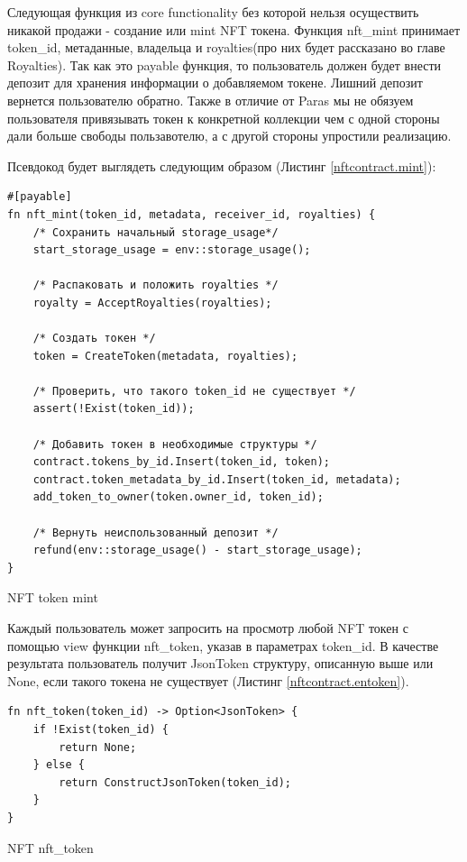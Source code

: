 Следующая функция из core functionality без которой нельзя осуществить никакой продажи - создание или mint NFT токена. Функция nft\_mint принимает token\_id, метаданные, владельца и royalties(про них будет рассказано во главе Royalties).
Так как это payable функция, то пользователь должен будет внести депозит для хранения информации о добавляемом токене. Лишний депозит вернется пользователю обратно.
Также в отличие от Paras мы не обязуем пользователя привязывать токен к конкретной коллекции чем с одной стороны дали больше свободы пользавотелю, а с другой стороны упростили реализацию.

Псевдокод будет выглядеть следующим образом (Листинг {\color{blue}\ref{nftcontract.mint}}):

\begin{listing}
\begin{verbatim}
#[payable]
fn nft_mint(token_id, metadata, receiver_id, royalties) {
    /* Сохранить начальный storage_usage*/
    start_storage_usage = env::storage_usage();

    /* Распаковать и положить royalties */
    royalty = AcceptRoyalties(royalties);

    /* Создать токен */
    token = CreateToken(metadata, royalties);

    /* Проверить, что такого token_id не существует */
    assert(!Exist(token_id));

    /* Добавить токен в необходимые структуры */
    contract.tokens_by_id.Insert(token_id, token);
    contract.token_metadata_by_id.Insert(token_id, metadata);
    add_token_to_owner(token.owner_id, token_id);

    /* Вернуть неиспользованный депозит */
    refund(env::storage_usage() - start_storage_usage);
}
\end{verbatim}
\caption{NFT token mint}
\label{nftcontract.mint}
\end{listing}

Каждый пользователь может запросить на просмотр любой NFT токен с помощью view функции nft\_token, указав в параметрах token\_id.
В качестве результата пользователь получит JsonToken структуру, описанную выше или None, если такого токена не существует (Листинг {\color{blue}\ref{nftcontract.entoken}}).

\begin{listing}
\begin{verbatim}
fn nft_token(token_id) -> Option<JsonToken> {
    if !Exist(token_id) {
        return None;
    } else {
        return ConstructJsonToken(token_id);
    }
}
\end{verbatim}
\caption{NFT nft\_token}
\label{nftcontract.entoken}
\end{listing}

